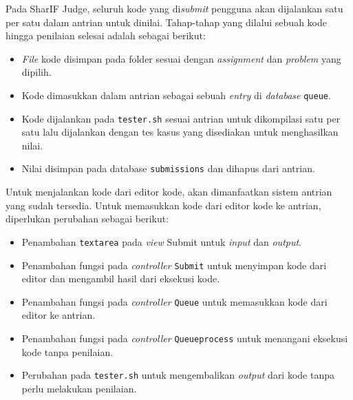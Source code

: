 Pada SharIF Judge, seluruh kode yang di\textit{submit} pengguna akan dijalankan satu per satu dalam antrian untuk dinilai. Tahap-tahap yang dilalui sebuah kode hingga penilaian selesai adalah sebagai berikut:
\begin{itemize}
    \item \textit{File} kode disimpan pada folder sesuai dengan \textit{assignment} dan \textit{problem} yang dipilih.
    \item Kode dimasukkan dalam antrian sebagai sebuah \textit{entry} di \textit{database} \verb|queue|.
    \item Kode dijalankan pada \verb|tester.sh| sesuai antrian untuk dikompilasi satu per satu lalu dijalankan dengan tes kasus yang disediakan untuk menghasilkan nilai.
    \item Nilai disimpan pada database \verb|submissions| dan dihapus dari antrian.
\end{itemize}

Untuk menjalankan kode dari editor kode, akan dimanfaatkan sistem antrian yang sudah tersedia. Untuk memasukkan kode dari editor kode ke antrian, diperlukan perubahan sebagai berikut:
\begin{itemize}
    \item Penambahan \verb|textarea| pada \textit{view} Submit untuk \textit{input} dan \textit{output}.
    \item Penambahan fungsi pada \textit{controller} \verb|Submit| untuk menyimpan kode dari editor dan mengambil hasil dari eksekusi kode.
    \item Penambahan fungsi pada \textit{controller} \verb|Queue| untuk memasukkan kode dari editor ke antrian.
    \item Penambahan fungsi pada \textit{controller} \verb|Queueprocess| untuk menangani eksekusi kode tanpa penilaian.
    \item Perubahan pada \verb|tester.sh| untuk mengembalikan \textit{output} dari kode tanpa perlu melakukan penilaian.
\end{itemize}